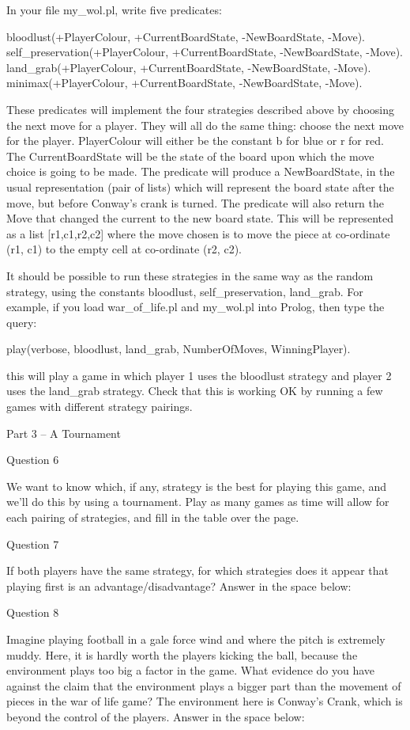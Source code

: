 \documentclass[a4wide, 11pt]{article}
\begin{document}
In your file my\_wol.pl, write five predicates:

bloodlust(+PlayerColour, +CurrentBoardState, -NewBoardState, -Move).
self\_preservation(+PlayerColour, +CurrentBoardState, -NewBoardState,
-Move). land\_grab(+PlayerColour, +CurrentBoardState, -NewBoardState,
-Move). minimax(+PlayerColour, +CurrentBoardState, -NewBoardState,
-Move).

These predicates will implement the four strategies described above by
choosing the next move for a player. They will all do the same thing:
choose the next move for the player. PlayerColour will either be the
constant b for blue or r for red. The CurrentBoardState will be the
state of the board upon which the move choice is going to be made. The
predicate will produce a NewBoardState, in the usual representation
(pair of lists) which will represent the board state after the move, but
before Conway's crank is turned. The predicate will also return the Move
that changed the current to the new board state. This will be
represented as a list {[}r1,c1,r2,c2{]} where the move chosen is to move
the piece at co-ordinate (r1, c1) to the empty cell at co-ordinate (r2,
c2).

It should be possible to run these strategies in the same way as the
random strategy, using the constants bloodlust, self\_preservation,
land\_grab. For example, if you load war\_of\_life.pl and my\_wol.pl
into Prolog, then type the query:

play(verbose, bloodlust, land\_grab, NumberOfMoves, WinningPlayer).

this will play a game in which player 1 uses the bloodlust strategy and
player 2 uses the land\_grab strategy. Check that this is working OK by
running a few games with different strategy pairings.

Part 3 -- A Tournament

Question 6

We want to know which, if any, strategy is the best for playing this
game, and we'll do this by using a tournament. Play as many games as
time will allow for each pairing of strategies, and fill in the table
over the page.

Question 7

If both players have the same strategy, for which strategies does it
appear that playing first is an advantage/disadvantage? Answer in the
space below:

Question 8

Imagine playing football in a gale force wind and where the pitch is
extremely muddy. Here, it is hardly worth the players kicking the ball,
because the environment plays too big a factor in the game. What
evidence do you have against the claim that the environment plays a
bigger part than the movement of pieces in the war of life game? The
environment here is Conway's Crank, which is beyond the control of the
players. Answer in the space below:
\end{document}
